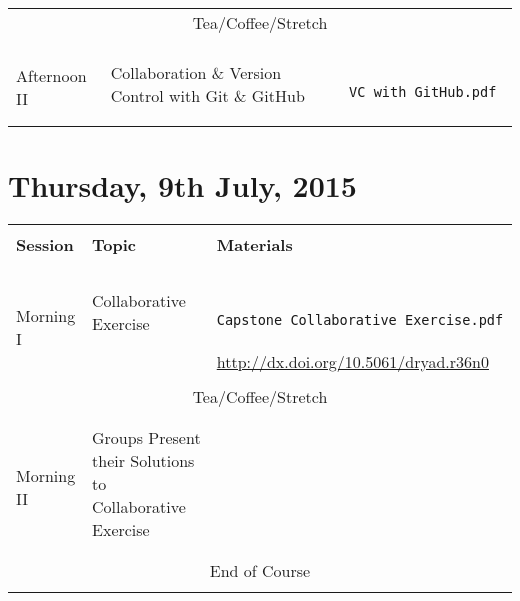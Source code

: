 \documentclass{article}[12pt]
\begin{document}
\begin{table}[h!]
\begin{tabular}{ |p{2cm}|p{5cm}|p{6cm}| }
\multicolumn{3}{c}{Tea/Coffee/Stretch}  \\ 
\multicolumn{3}{c}{} \\ \hline
                               &                              & \\
\multirow{3}{*}{Afternoon II}  & Collaboration \& Version Control with Git \& GitHub & \begin{verbatim} VC_with_GitHub.pdf \end{verbatim} \\
                               &                              & \\ \hline \hline
\end{tabular}
\end{table}

\clearpage
\section*{Thursday, 9th July, 2015}
\begin{table}[h!]
\begin{tabular}{ |p{2cm}|p{5cm}|p{6cm}| }
\hline
                               &                              & \\
\textbf{Session}               & \textbf{Topic}               & \textbf{Materials} \\ 
                               &                              & \\ \hline \hline
 & & \\



 & & \\
\multirow{2}{*}{Morning I }    & Collaborative Exercise & \begin{verbatim} Capstone_Collaborative_Exercise.pdf \end{verbatim}  \\
                              & &  \url{http://dx.doi.org/10.5061/dryad.r36n0} \\ \hline 
\multicolumn{3}{c}{} \\ 
\multicolumn{3}{c}{Tea/Coffee/Stretch}  \\ 
\multicolumn{3}{c}{} \\ \hline
 & & \\
\multirow{2}{*}{Morning II}      & Groups Present their Solutions to Collaborative Exercise      & \\
 & & \\ \hline
\multicolumn{3}{c}{} \\
\multicolumn{3}{c}{End of Course}  \\ 
\multicolumn{3}{c}{} \\
\end{tabular}
\end{table}
\end{document}
